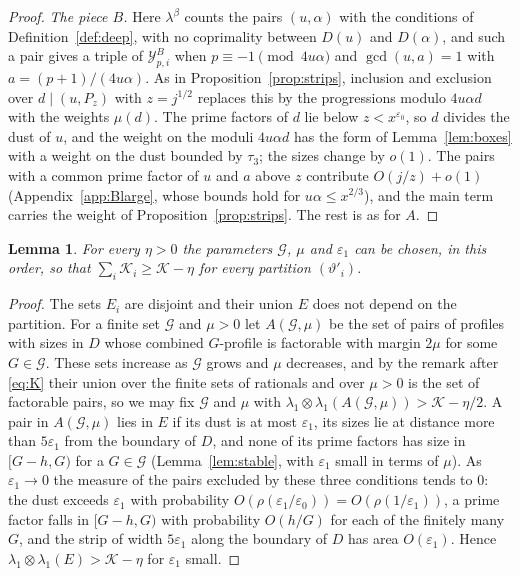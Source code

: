\documentclass[aps,prd,twocolumn,superscriptaddress,nofootinbib,longbibliography,floatfix,showkeys,nobalancelastpage,amsmath,amssymb,10pt]{revtex4-2}
\theoremstyle{plain}
\newtheorem{lemma}[theorem]{Lemma}
\theoremstyle{definition}
\theoremstyle{plain}
\newcommand{\eps}{\varepsilon}
\begin{document}
\begin{proof}
\emph{The piece $B$.} Here $\lambda^\beta$ counts the pairs $(u,\alpha)$ with the conditions of Definition~\ref{def:deep}, with no coprimality between $D(u)$ and $D(\alpha)$, and such a pair gives a triple of $\mathcal Y^B_{p,i}$ when $p\equiv-1\pmod{4u\alpha}$ and $\gcd(u,a)=1$ with $a=(p+1)/(4u\alpha)$. As in Proposition~\ref{prop:strips}, inclusion and exclusion over $d\mid(u,P_z)$ with $z=j^{1/2}$ replaces this by the progressions modulo $4u\alpha d$ with the weights $\mu(d)$. The prime factors of $d$ lie below $z<x^{\eps_0}$, so $d$ divides the dust of $u$, and the weight on the moduli $4u\alpha d$ has the form of Lemma~\ref{lem:boxes} with a weight on the dust bounded by $\tau_3$; the sizes change by $o(1)$. The pairs with a common prime factor of $u$ and $a$ above $z$ contribute $O(j/z)+o(1)$ (Appendix~\ref{app:Blarge}, whose bounds hold for $u\alpha\le x^{2/3}$), and the main term carries the weight of Proposition~\ref{prop:strips}. The rest is as for $A$.
\end{proof}

\begin{lemma}\label{lem:deeplimit}
For every $\eta>0$ the parameters $\mathcal G$, $\mu$ and $\eps_1$ can be chosen, in this order, so that $\sum_i\mathcal K_i\ge\mathcal K-\eta$ for every partition $(\vartheta'_i)$.
\end{lemma}

\begin{proof}
The sets $E_i$ are disjoint and their union $E$ does not depend on the partition. For a finite set $\mathcal G$ and $\mu>0$ let $A(\mathcal G,\mu)$ be the set of pairs of profiles with sizes in $D$ whose combined $G$-profile is factorable with margin $2\mu$ for some $G\in\mathcal G$. These sets increase as $\mathcal G$ grows and $\mu$ decreases, and by the remark after \eqref{eq:K} their union over the finite sets of rationals and over $\mu>0$ is the set of factorable pairs, so we may fix $\mathcal G$ and $\mu$ with $\lambda_1\otimes\lambda_1(A(\mathcal G,\mu))>\mathcal K-\eta/2$. A pair in $A(\mathcal G,\mu)$ lies in $E$ if its dust is at most $\eps_1$, its sizes lie at distance more than $5\eps_1$ from the boundary of $D$, and none of its prime factors has size in $[G-h,G)$ for a $G\in\mathcal G$ (Lemma~\ref{lem:stable}, with $\eps_1$ small in terms of $\mu$). As $\eps_1\to0$ the measure of the pairs excluded by these three conditions tends to $0$: the dust exceeds $\eps_1$ with probability $O(\rho(\eps_1/\eps_0))=O(\rho(1/\eps_1))$, a prime factor falls in $[G-h,G)$ with probability $O(h/G)$ for each of the finitely many $G$, and the strip of width $5\eps_1$ along the boundary of $D$ has area $O(\eps_1)$. Hence $\lambda_1\otimes\lambda_1(E)>\mathcal K-\eta$ for $\eps_1$ small.
\end{proof}
\end{document}
